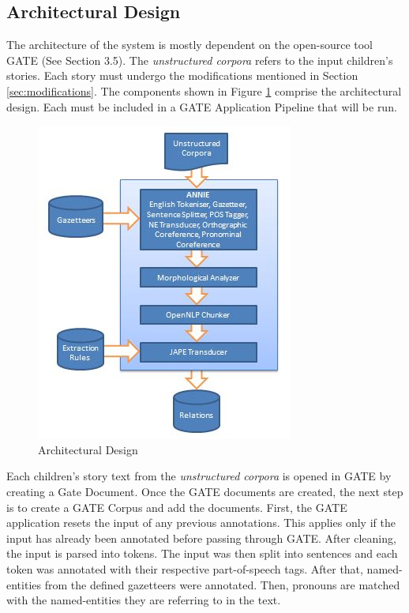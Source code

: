 \subsection{Architectural Design}
\label{sec:archidesign}

The architecture of the system is mostly dependent on the open-source tool GATE (See Section 3.5). The \textit{unstructured corpora} refers to the input children's stories. Each story must undergo the modifications mentioned in Section \ref{sec:modifications}. The components shown in Figure \ref{fig:archidesign} comprise the architectural design. Each must be included in a GATE Application Pipeline that will be run.

\begin{figure}[h]                %
   \centering                    %
   \includegraphics{archidesign1.jpg}      %
   \caption{Architectural Design}
    \label{fig:archidesign}
\end{figure}

Each children's story text from the \textit{unstructured corpora} is opened in GATE by creating a Gate Document. Once the GATE documents are created, the next step is to create a GATE Corpus and add the documents. First, the GATE application resets the input of any previous annotations. This applies only if the input has already been annotated before passing through GATE. After cleaning, the input is parsed into tokens. The input was then  split into sentences and each token was annotated with their respective part-of-speech tags. After that, named-entities from the defined gazetteers were annotated. Then, pronouns are matched with the named-entities they are referring to in the text. 

